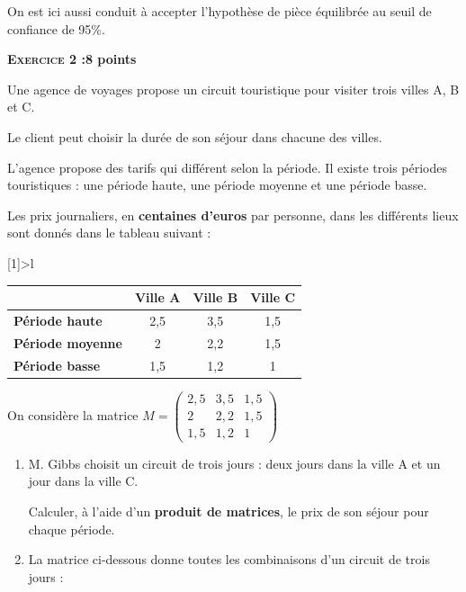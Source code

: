 \begin{spacing}{1.2}
\begin{enumerate}
On est ici aussi conduit à accepter l'hypothèse de pièce équilibrée au seuil de confiance de 95\%.
\end{enumerate}

\newpage
\textbf{\textsc{Exercice 2 :}\hfill 8 points}%
\medskip

Une agence de voyages propose un circuit touristique pour visiter trois villes A, B et C.

Le client peut choisir la durée de son séjour dans chacune des villes.

L'agence propose des tarifs qui différent selon la période. Il existe trois périodes touristiques : une période haute, une période moyenne et une période basse.

Les prix journaliers, en \textbf{centaines d'euros} par personne, dans les différents lieux sont donnés dans le tableau suivant :

\begin{center}
\newcolumntype{K}[1]{>{}l}
\begin{tabular}{|K{gray}|*{3}{c|}}
 &  \bf Ville A & \bf Ville B & \bf Ville C\\
\hline
\bf Période haute & 2,5 & 3,5 & 1,5\\
\hline
\bf Période moyenne & 2 & 2,2 & 1,5\\
\hline
\bf Période basse & 1,5 & 1,2 & 1\\
\hline
\end{tabular}
\end{center}

On considère la matrice $M=\begin{pmatrix}
2,5&3,5&1,5\\2&2,2&1,5\\1,5&1,2&1
\end{pmatrix}$

\begin{enumerate}[\bf 1.]
\item M. Gibbs choisit un circuit de trois jours : deux jours dans la ville A et un jour dans la ville C.

Calculer, à l'aide d'un \textbf{produit de matrices}, le prix de son séjour pour chaque période.

\item La matrice ci-dessous donne toutes les combinaisons d'un circuit de trois jours :


\end{enumerate}
\end{spacing}
